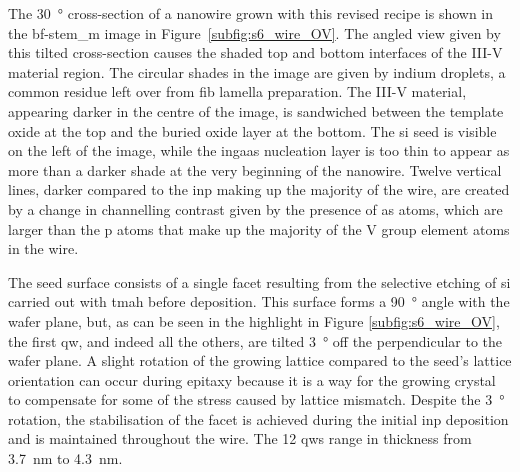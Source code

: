 The \qty{30}{\degree} cross-section of a nanowire grown with this revised recipe is shown in the \acs{bf}-\acs{stem_m} image in Figure~\ref{subfig:s6_wire_OV}. The angled view given by this tilted cross-section causes the shaded top and bottom interfaces of the III-V material region. The circular shades in the image are given by indium droplets, a common residue left over from \acs{fib} lamella preparation. The III-V material, appearing darker in the centre of the image, is sandwiched between the template oxide at the top and the buried oxide layer at the bottom. The \acs{si} seed is visible on the left of the image, while the \acs{ingaas} nucleation layer is too thin to appear as more than a darker shade at the very beginning of the nanowire. Twelve vertical lines, darker compared to the \acs{inp} making up the majority of the wire, are created by a change in channelling contrast given by the presence of \acl{as} atoms, which are larger than the \acl{p} atoms that make up the majority of the V group element atoms in the wire.

The seed surface consists of a single  facet resulting from the selective etching of \acs{si} carried out with \acs{tmah} before deposition. This surface forms a \qty{90}{\degree} angle with the wafer plane, but, as can be seen in the highlight in Figure \ref{subfig:s6_wire_OV}, the first \acl{qw}, and indeed all the others, are tilted \qty{3}{\degree} off the perpendicular to the wafer plane. A slight rotation of the growing lattice compared to the seed's lattice orientation can occur during epitaxy because it is a way for the growing crystal to compensate for some of the stress caused by lattice mismatch. Despite the \qty{3}{\degree} rotation, the stabilisation of the  facet is achieved during the initial \acs{inp} deposition and is maintained throughout the wire. The \num{12} \acl{qw}s range in thickness from \qty{3.7}{\nano\metre} to \qty{4.3}{\nano\metre}.


